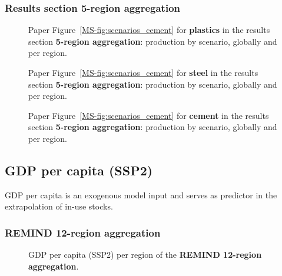 \clearpage
\subsubsection{Results section 5-region aggregation}

\begin{figure}[htbp]
    \centering
    \caption{Paper Figure~\ref{MS-fig:scenarios_cement} for \textbf{plastics} in the results section \textbf{5-region aggregation}: production by scenario, globally and per region.}
    \label{fig:figure_8_plastics_agg5}
\end{figure}

\begin{figure}[htbp]
    \centering
    \caption{Paper Figure~\ref{MS-fig:scenarios_cement} for \textbf{steel} in the results section \textbf{5-region aggregation}: production by scenario, globally and per region.}
    \label{fig:figure_8_steel_agg5}
\end{figure}

\begin{figure}[htbp]
    \centering
    \caption{Paper Figure~\ref{MS-fig:scenarios_cement} for \textbf{cement} in the results section \textbf{5-region aggregation}: production by scenario, globally and per region.}
    \label{fig:figure_8_cement_agg5}
\end{figure}

\clearpage


\subsection{GDP per capita (SSP2)} \label{sec:add_gdppc}

GDP per capita is an exogenous model input and serves as predictor in the extrapolation of in-use stocks.

\subsubsection{REMIND 12-region aggregation}
\begin{figure}[htbp]
    \centering
    \caption{GDP per capita (SSP2) per region of the \textbf{REMIND 12-region aggregation}.}
    \label{fig:gdppc_h12}
\end{figure}

